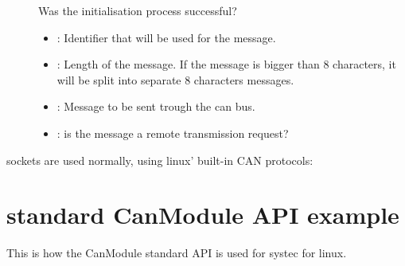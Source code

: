 \documentclass[letterpaper,10pt,english]{sphinxmanual}
\begin{document}
\begin{fulllineitems}
\begin{fulllineitems}
\begin{description}
\item[{}] \leavevmode
Was the initialisation process successful? 

\item[{}] \leavevmode\begin{itemize}
\item {} 
: Identifier that will be used for the message. 

\item {} 
: Length of the message. If the message is bigger than 8 characters, it will be split into separate 8 characters messages. 

\item {} 
: Message to be sent trough the can bus. 

\item {} 
: is the message a remote transmission request? 

\end{itemize}

\end{description}


\end{fulllineitems}


\end{fulllineitems}


sockets are used normally, using linux’ built-in CAN protocols:

\begin{sphinxVerbatim}[commandchars=\\\{\}]
    
\end{sphinxVerbatim}


\section{standard CanModule API example}
\label{\detokenize{vendors/systec:standard-canmodule-api-example}}
This is how the CanModule standard API is used for systec for linux.
\end{document}
